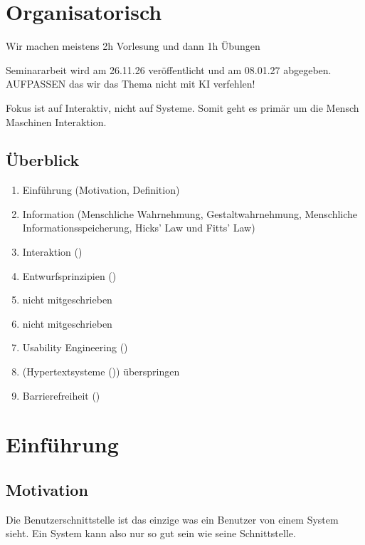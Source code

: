 \documentclass[a4paper]{article}
\title{\docTitle}
\author{Moritz}
\date{\today}
\begin{document}
\maketitle
\tableofcontents


\section{Organisatorisch}

Wir machen meistens 2h Vorlesung und dann 1h Übungen

Seminararbeit wird am 26.11.26 veröffentlicht und am 08.01.27 abgegeben. AUFPASSEN das wir das Thema nicht mit KI verfehlen!

Fokus ist auf Interaktiv, nicht auf Systeme. Somit geht es primär um die Mensch Maschinen Interaktion.

\subsection{Überblick}

\begin{enumerate}
    \item Einführung (Motivation, Definition)
    \item Information (Menschliche Wahrnehmung, Gestaltwahrnehmung, Menschliche Informationsspeicherung, Hicks' Law und Fitts' Law)
    \item Interaktion ()
    \item Entwurfsprinzipien ()
    \item nicht mitgeschrieben
    \item nicht mitgeschrieben
    \item Usability Engineering ()
    \item (Hypertextsysteme ()) überspringen
    \item Barrierefreiheit ()
\end{enumerate}

\section{Einführung}

\subsection{Motivation}

Die Benutzerschnittstelle ist das einzige was ein Benutzer von einem System sieht. Ein System kann also nur so gut sein wie seine Schnittstelle.
\end{document}
